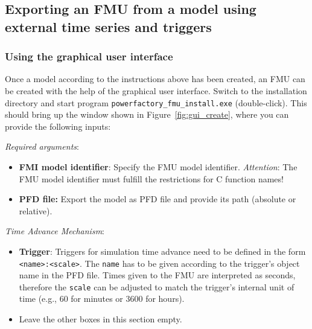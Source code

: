 \clearpage

\subsection{Exporting an FMU from a model using external time series and triggers}

\subsubsection*{Using the graphical user interface}

Once a \pf model according to the instructions above has been created, an FMU can be created with the help of the graphical user interface.
Switch to the installation directory and start program \texttt{powerfactory\_fmu\_install.exe} (double-click).
This should bring up the window shown in Figure~\ref{fig:gui_create}, where you can provide the following inputs:

\textit{Required arguments}:
\begin{itemize}
   \item \textbf{FMI model identifier}: Specify the FMU model identifier. 
   \emph{Attention}: The FMU model identifier must fulfill the restrictions for C function names!
   \item \textbf{\pf PFD file:} Export the \pf model as PFD file and provide its path (absolute or relative).
\end{itemize}

\textit{Time Advance Mechanism}:
\begin{itemize}
   \item \textbf{Trigger}:
   Triggers for simulation time advance need to be defined in the form \texttt{<name>:<scale>}.
   The \texttt{name} has to be given according to the trigger's object name in the PFD file.
   Times given to the FMU are interpreted as seconds, therefore the \texttt{scale} can be adjusted to match the trigger's internal unit of time (e.g., 60 for minutes or 3600 for hours).
   \item Leave the other boxes in this section empty.
\end{itemize}

